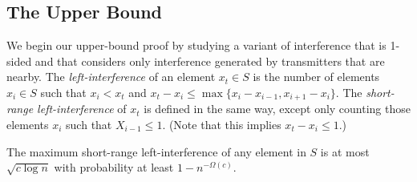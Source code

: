 \documentclass{patmorin}
\begin{document}
\subsection{The Upper Bound}

We begin our upper-bound proof by studying a variant of interference that
is 1-sided and that considers only interference generated by transmitters
that are nearby.  The \emph{left-interference} of an element $x_t\in
S$ is the number of elements $x_i\in S$ such that $x_i < x_t$ and
$x_t-x_i \le \max\{x_i-x_{i-1},x_{i+1}-x_i\}$.  The \emph{short-range
left-interference} of $x_t$ is defined in the same way, except only
counting those elements $x_i$ such that $X_{i-1} \le 1$. (Note that this
implies $x_t-x_i \le 1$.)

\begin{lem}
The maximum short-range left-interference of any element in $S$ is at
most $\sqrt{c\log n}$ with probability at least $1-n^{-\Omega(c)}$.
\end{lem}
\end{document}
